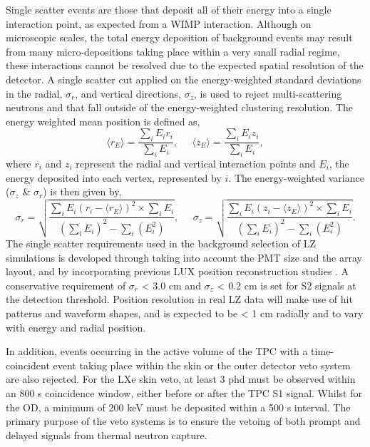 Single scatter events are those that deposit all of their energy into a single interaction point, as expected from a WIMP interaction. Although on microscopic scales, the total energy deposition of background events may result from many micro-depositions taking place within a very small radial regime, these interactions cannot be resolved due to the expected spatial resolution of the detector. A single scatter cut applied on the energy-weighted standard deviations in the radial, $\sigma_{r}$, and vertical directions, $\sigma_{z}$, is used to reject multi-scattering neutrons and \grays{} that fall outside of the energy-weighted clustering resolution. The energy weighted mean position is defined as, 
%
\begin{equation}
    \big\langle r_{E} \big\rangle = \frac{\sum_{i}E_{i}r_{i}}{\sum_{i}E_{i}}, \;\;\;\;\; \big\langle z_{E} \big\rangle = \frac{\sum_{i}E_{i}z_{i}}{\sum_{i}E_{i}},
    \label{eq:weighted_mean_position}
\end{equation}
%
where $r_{i}$ and $z_{i}$ represent the radial and vertical interaction points and $E_{i}$, the energy deposited into each vertex, represented by $i$. The energy-weighted variance ($\sigma_{z}$ \& $\sigma_{r}$) is then given by,
%
\begin{equation}
    \sigma_{r} = \sqrt{\frac{\sum_{i}E_{i}(r_{i} - \big\langle r_{E} \big\rangle)^{2} \times \sum_{i}E_{i}}{(\sum_{i}E_{i})^{2} - \sum_{i}(E_{i}^{2})}}, \;\;\;\;\; \sigma_{z} = \sqrt{\frac{\sum_{i}E_{i}(z_{i} - \big\langle z_{E} \big\rangle)^{2} \times \sum_{i}E_{i}}{(\sum_{i}E_{i})^{2} - \sum_{i}(E_{i}^{2})}}.
    \label{eq:energy_weighted_sd}
\end{equation}
%
The single scatter requirements used in the background selection of LZ simulations is developed through taking into account the PMT size and the array layout, and by incorporating previous LUX position reconstruction studies \cite{Akerib_2018_lux_position}. A conservative requirement of $\sigma_{r}$ < 3.0 cm and $\sigma_{z}$ < 0.2 cm is set for S2 signals at the detection threshold. Position resolution in real LZ data will make use of hit patterns and waveform shapes, and is expected to be < 1 cm radially and to vary with energy and radial position. 

In addition, events occurring in the active volume of the TPC with a time-coincident event taking place within the skin or the outer detector veto system are also rejected. For the LXe skin veto, at least 3 phd must be observed within an 800 \micro{}s coincidence window, either before or after the TPC S1 signal. Whilst for the OD, a minimum of 200 keV must be deposited within a 500 \micro{}s interval. The primary purpose of the veto systems is to ensure the vetoing of both prompt \gamma and delayed signals from thermal neutron capture.

